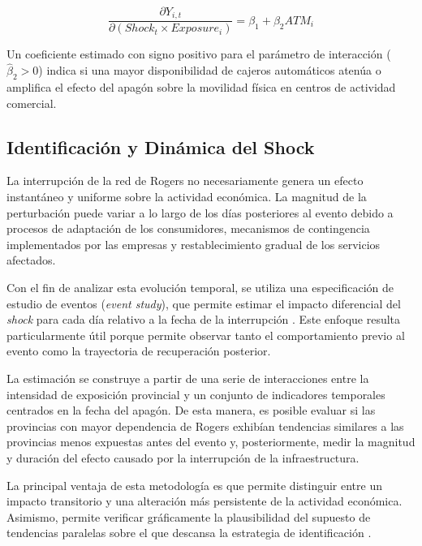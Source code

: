 \begin{equation}
    \frac{\partial Y_{i,t}}{\partial \left( Shock_t \times Exposure_i \right)} = \beta_1 + \beta_2 ATM_i
\end{equation}

Un coeficiente estimado con signo positivo para el par\'ametro de interacci\'on ($\hat{\beta}_2 > 0$) indica si una mayor disponibilidad de cajeros autom\'aticos aten\'ua o amplifica el efecto del apag\'on sobre la movilidad f\'isica en centros de actividad comercial.

\subsection{Identificaci\'on y Din\'amica del Shock}
\label{sec:4_3}

La interrupci\'on de la red de Rogers no necesariamente genera un efecto instant\'aneo y uniforme sobre la actividad econ\'omica. La magnitud de la perturbaci\'on puede variar a lo largo de los d\'ias posteriores al evento debido a procesos de adaptaci\'on de los consumidores, mecanismos de contingencia implementados por las empresas y restablecimiento gradual de los servicios afectados.

Con el fin de analizar esta evoluci\'on temporal, se utiliza una especificaci\'on de estudio de eventos (\textit{event study}), que permite estimar el impacto diferencial del \textit{shock} para cada d\'ia relativo a la fecha de la interrupci\'on \citep{angrist2009mostly}. Este enfoque resulta particularmente \'util porque permite observar tanto el comportamiento previo al evento como la trayectoria de recuperaci\'on posterior.

La estimaci\'on se construye a partir de una serie de interacciones entre la intensidad de exposici\'on provincial y un conjunto de indicadores temporales centrados en la fecha del apag\'on. De esta manera, es posible evaluar si las provincias con mayor dependencia de Rogers exhib\'ian tendencias similares a las provincias menos expuestas antes del evento y, posteriormente, medir la magnitud y duraci\'on del efecto causado por la interrupci\'on de la infraestructura.

La principal ventaja de esta metodolog\'ia es que permite distinguir entre un impacto transitorio y una alteraci\'on m\'as persistente de la actividad econ\'omica. Asimismo, permite verificar gr\'aficamente la plausibilidad del supuesto de tendencias paralelas sobre el que descansa la estrategia de identificaci\'on \citep{callaway2024continuous, baker2026difference}.

